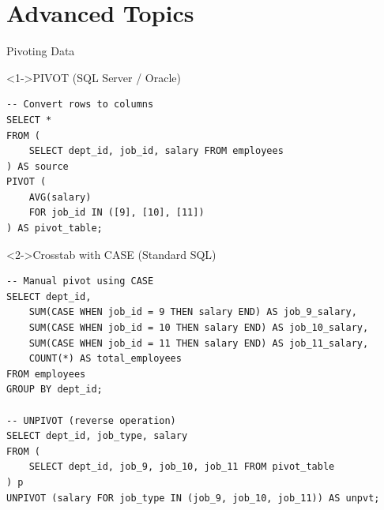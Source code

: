 \documentclass[aspectratio=169,11pt]{beamer}
\begin{document}
\section{Advanced Topics}

\begin{frame}[fragile]{Pivoting Data}
\begin{exampleblock}<1->{PIVOT (SQL Server / Oracle)}
\begin{lstlisting}
-- Convert rows to columns
SELECT *
FROM (
    SELECT dept_id, job_id, salary FROM employees
) AS source
PIVOT (
    AVG(salary)
    FOR job_id IN ([9], [10], [11])
) AS pivot_table;
\end{lstlisting}
\end{exampleblock}

\pause
\begin{exampleblock}<2->{Crosstab with CASE (Standard SQL)}
\begin{lstlisting}
-- Manual pivot using CASE
SELECT dept_id,
    SUM(CASE WHEN job_id = 9 THEN salary END) AS job_9_salary,
    SUM(CASE WHEN job_id = 10 THEN salary END) AS job_10_salary,
    SUM(CASE WHEN job_id = 11 THEN salary END) AS job_11_salary,
    COUNT(*) AS total_employees
FROM employees
GROUP BY dept_id;

-- UNPIVOT (reverse operation)
SELECT dept_id, job_type, salary
FROM (
    SELECT dept_id, job_9, job_10, job_11 FROM pivot_table
) p
UNPIVOT (salary FOR job_type IN (job_9, job_10, job_11)) AS unpvt;
\end{lstlisting}
\end{exampleblock}
\end{frame}
\end{document}
